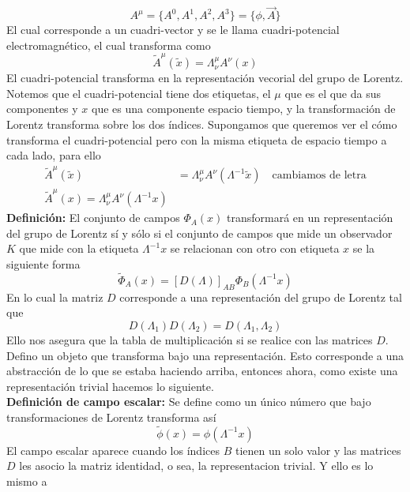 \documentclass[../main.tex]{subfiles}
\begin{document}
\begin{equation}
  A^\mu = \{A^0,A^1,A^2,A^3\} = \{\phi,\vec{A}\}
\end{equation}
El cual corresponde a un cuadri-vector y se le llama cuadri-potencial electromagnético, el cual transforma como
\begin{equation}
  \tilde{{A}}^\mu(\tilde{x}) = \Lambda_\nu^\mu A^\nu(x) 
\end{equation}
El cuadri-potencial transforma en la representación vecorial del grupo de Lorentz. Notemos que el cuadri-potencial tiene dos etiquetas, el $\mu$ que es el que da sus componentes y $x$ que es una componente espacio tiempo, y la transformación de Lorentz transforma sobre los dos índices. Supongamos que queremos ver el cómo transforma el cuadri-potencial pero con la misma etiqueta de espacio tiempo a cada lado, para ello
\begin{align*}
  \tilde{{A}}^\mu(\tilde{x}) & = \Lambda^\mu_\nu A^\nu (\Lambda^{-1}\tilde{x}) \quad \text{cambiamos de letra} \\
  \tilde{{A}}^\mu(x) = \Lambda^\mu_\nu A^\nu (\Lambda^{-1}x) 
\end{align*}
\textbf{Definición:} El conjunto de campos $\Phi_A(x)$ transformará en un representación del grupo de Lorentz sí y sólo si el conjunto de campos que mide un observador $K$ que mide con la etiqueta $\Lambda^{-1}x$ se relacionan con otro con etiqueta $x$ se la siguiente forma
\begin{equation}
  \tilde{\Phi}_A(x) = \left[ D(\Lambda) \right]_{AB} \Phi_B (\Lambda^{-1}x)
\end{equation}
En lo cual la matriz $D$ corresponde a una representación del grupo de Lorentz tal que
\begin{equation}
  D(\Lambda_1)D(\Lambda_2) = D(\Lambda_1,\Lambda_2)
\end{equation}
Ello nos asegura que la tabla de multiplicación si se realice con las matrices $D$. Defino un objeto que transforma bajo una representación. Esto corresponde a una abstracción de lo que se estaba haciendo arriba, entonces ahora, como existe una representación trivial hacemos lo siguiente. \\
\textbf{Definición de campo escalar:} Se define como un único número que bajo transformaciones de Lorentz transforma así
\begin{equation} \label{eq:transformación campo escalar}
  \tilde{\phi}(x)=\phi(\Lambda^{-1}x)
\end{equation}
El campo escalar aparece cuando los índices $B$ tienen un solo valor y las matrices $D$ les asocio la matriz identidad, o sea, la representacion trivial. Y ello es lo mismo a 
\end{document}
